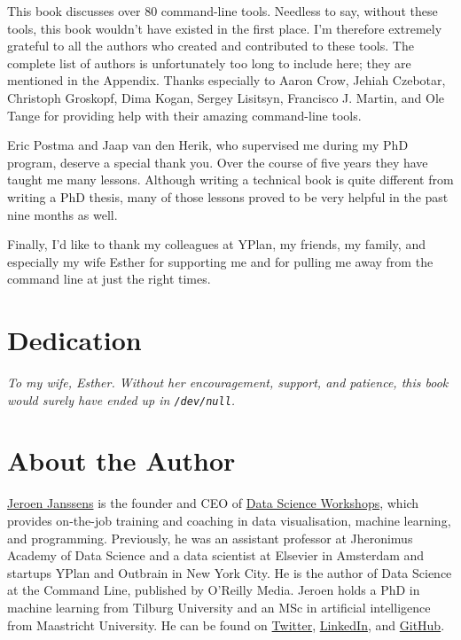 \documentclass[
]{book}
\theoremstyle{definition}
\theoremstyle{definition}
\theoremstyle{definition}
\theoremstyle{remark}
\begin{document}
This book discusses over 80 command-line tools. Needless to say, without these tools, this book wouldn't have existed in the first place. I'm therefore extremely grateful to all the authors who created and contributed to these tools. The complete list of authors is unfortunately too long to include here; they are mentioned in the Appendix. Thanks especially to Aaron Crow, Jehiah Czebotar, Christoph Groskopf, Dima Kogan, Sergey Lisitsyn, Francisco J. Martin, and Ole Tange for providing help with their amazing command-line tools.

Eric Postma and Jaap van den Herik, who supervised me during my PhD program, deserve a special thank you. Over the course of five years they have taught me many lessons. Although writing a technical book is quite different from writing a PhD thesis, many of those lessons proved to be very helpful in the past nine months as well.

Finally, I'd like to thank my colleagues at YPlan, my friends, my family, and especially my wife Esther for supporting me and for pulling me away from the command line at just the right times.

\hypertarget{dedication}{%
\section*{Dedication}\label{dedication}}

\emph{To my wife, Esther. Without her encouragement, support, and patience, this book would surely have ended up in \texttt{/dev/null}.}

\hypertarget{about-the-author}{%
\section*{About the Author}\label{about-the-author}}

\href{http://jeroenjanssens.com/}{Jeroen Janssens} is the founder and CEO of \href{https://datascienceworkshops.com}{Data Science Workshops}, which provides on-the-job training and coaching in data visualisation, machine learning, and programming. Previously, he was an assistant professor at Jheronimus Academy of Data Science and a data scientist at Elsevier in Amsterdam and startups YPlan and Outbrain in New York City. He is the author of Data Science at the Command Line, published by O'Reilly Media. Jeroen holds a PhD in machine learning from Tilburg University and an MSc in artificial intelligence from Maastricht University. He can be found on \href{https://twitter.com/jeroenhjanssens/}{Twitter}, \href{http://www.linkedin.com/in/jeroenjanssens}{LinkedIn}, and \href{https://github.com/jeroenjanssens}{GitHub}.
\end{document}

